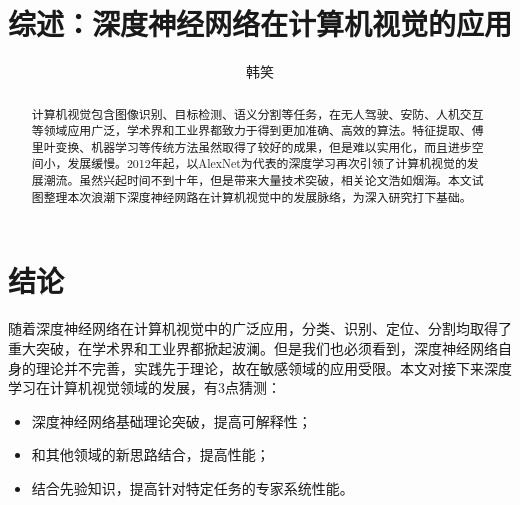 \documentclass{ctexart}
\title{综述：深度神经网络在计算机视觉的应用}
\author{韩笑}
\begin{document}
\nocite{*}

\maketitle

\tableofcontents
 
\clearpage
\begin{abstract}
计算机视觉包含图像识别、目标检测、语义分割等任务，在无人驾驶、安防、人机交互等领域应用广泛，学术界和工业界都致力于得到更加准确、高效的算法。特征提取、傅里叶变换、机器学习等传统方法虽然取得了较好的成果，但是难以实用化，而且进步空间小，发展缓慢。2012年起，以AlexNet为代表的深度学习再次引领了计算机视觉的发展潮流。虽然兴起时间不到十年，但是带来大量技术突破，相关论文浩如烟海。本文试图整理本次浪潮下深度神经网路在计算机视觉中的发展脉络，为深入研究打下基础。
\end{abstract}











\section{结论}
随着深度神经网络在计算机视觉中的广泛应用，分类、识别、定位、分割均取得了重大突破，在学术界和工业界都掀起波澜。但是我们也必须看到，深度神经网络自身的理论并不完善，实践先于理论，故在敏感领域的应用受限。本文对接下来深度学习在计算机视觉领域的发展，有3点猜测：
\begin{itemize}
\item 深度神经网络基础理论突破，提高可解释性；
\item 和其他领域的新思路结合，提高性能；
\item 结合先验知识，提高针对特定任务的专家系统性能。
\end{itemize}



 
\end{document}
